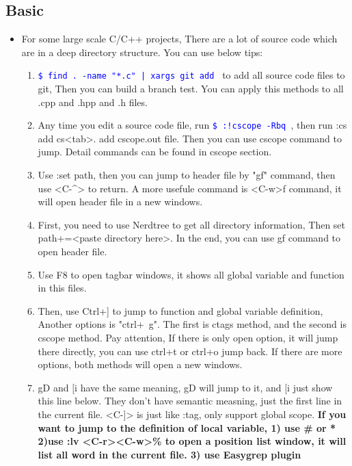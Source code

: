 \documentclass[a4paper,12pt,twoside]{book}
\newcommand{\linuxcommand}[1]{\texttt{\textcolor{blue}{\$ #1 \Pisymbol{psy}{191}}}}
\begin{document}
\subsection{Basic}
\begin{itemize}
	\item For some large scale C/C++ projects, There are a lot of source code which are in a deep directory structure. You can use below tips:
\begin{enumerate}
		\item \linuxcommand{find . -name "*.c" | xargs git add} to add all source code files to git, Then you can build a branch test. You can apply this methods to all .cpp and .hpp and .h files. 
				
		\item Any time you edit a source code file, run \linuxcommand{:!cscope -Rbq}, then run :cs add cs<tab>. add cscope.out file. Then you can use cscope command to jump. Detail commands can be found in cscope section.

		\item Use :set path, then you can jump to header file by "gf" command, then use <C-\^{}> to return. A more usefule command is <C-w>f command, it will open header file in a new windows.  

		\item First, you need to use Nerdtree to get all directory information, Then set path+=<paste directory here>. In the end, you can use gf command to open header file.

		\item Use F8 to open tagbar windows, it shows all global variable and function in this files.

		\item Then, use Ctrl+] to jump to function and global variable definition, Another options is "ctrl+\ g". The first is ctags method, and the second is cscope method. Pay attention, If there is only open option, it will jump there directly, you can use ctrl+t or ctrl+o jump back. If there are more options, both methods will open a new windows. 

		\item gD and $[$i have the same meaning, gD will jump to it, and $[$i just show this line below. They don't have semantic measning, just the first line in the current file. <C-]> is just like :tag, only support global scope. \textbf{If you want to jump to the definition of local variable, 1) use \# or * 2)use :lv <C-r><C-w>\% to open a position list window, it will list all word in the current file. 3) use Easygrep plugin}


\end{enumerate}
\end{itemize}
\end{document}
